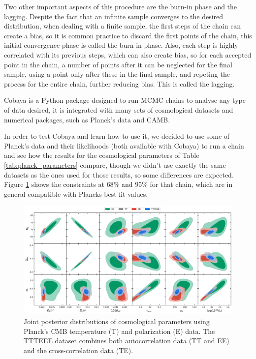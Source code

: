 \documentclass[openany,a4paper,12pt,oneside]{book}
\begin{document}
\begin{spacing}{1.5}
Two other important aspects of this procedure are the burn-in phase and the lagging. Despite the fact that an infinite sample converges to the desired distribution, when dealing with a finite sample, the first steps of the chain can create a bias, so it is common practice to discard the first points of the chain, this initial convergence phase is called the burn-in phase. Also, each step is highly correlated with its previous steps, which can also create bias, so for each accepted point in the chain, a number of points after it can be neglected for the final sample, using a point only after these in the final sample, and repeting the process for the entire chain, further reducing bias. This is called the lagging.

Cobaya is a Python package designed to run MCMC chains to analyse any type of data desired, it is integrated with many sets of cosmological datasets and numerical packages, such as Planck's data and CAMB. 
 
In order to test Cobaya and learn how to use it, we decided to use some of Planck's data and their likelihoods (both available with Cobaya) to run a chain and see how the results for the cosmological parameters of Table \ref{tab:planck_parameters} compare, though we didn't use exactly the same datasets as the ones used for those results, so some differences are expected. Figure \ref{fig:cobaya_test} shows the constraints at $68\%$ and $95\%$ for that chain, which are in general compatible with Plancks best-fit values.

\begin{figure}[!htb]
	\centering
	\includegraphics[width=\linewidth]{Imagens/compare_likelihoods.png}
	\caption{Joint posterior distributions of cosmological parameters using Planck's CMB temperature (T) and polarization (E) data. The TTTEEE dataset combines both autocorrelation data (TT and EE) and the cross-correlation data (TE).}
	\label{fig:cobaya_test}
\end{figure}


\end{spacing}
\end{document}
